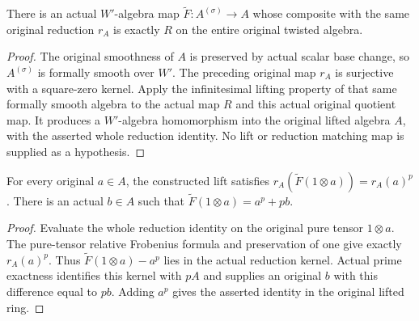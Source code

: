 \begin{theorem}
\label{thm:witt-two-actual-affine-relative-lift}
\leanok
{}
There is an actual $W'$-algebra map
$\widetilde F:A^{(\sigma)}\to A$ whose composite
with the same original reduction $r_A$ is exactly
$R$ on the entire original twisted algebra.
\end{theorem}
\begin{proof}
The original smoothness of $A$ is preserved by
actual scalar base change, so $A^{(\sigma)}$ is
formally smooth over $W'$. The preceding original
map $r_A$ is surjective with a square-zero kernel.
Apply the infinitesimal lifting property of that
same formally smooth algebra to the actual map
$R$ and this actual original quotient map.
It produces a $W'$-algebra homomorphism into the
original lifted algebra $A$, with the asserted
whole reduction identity. No lift or reduction
matching map is supplied as a hypothesis.
\end{proof}

\begin{corollary}
\label{cor:witt-two-relative-lift-coordinate-correction}
\leanok
{}
For every original $a\in A$, the constructed lift satisfies
$r_A(\widetilde F(1\otimes a))=r_A(a)^p$.
There is an actual $b\in A$ such that
$\widetilde F(1\otimes a)=a^p+pb$.
\end{corollary}
\begin{proof}
Evaluate the whole reduction identity on the original pure tensor
$1\otimes a$. The pure-tensor relative Frobenius formula and
preservation of one give exactly $r_A(a)^p$. Thus
$\widetilde F(1\otimes a)-a^p$ lies in the actual reduction
kernel. Actual prime exactness identifies this kernel with $pA$
and supplies an original $b$ with this difference equal to $pb$.
Adding $a^p$ gives the asserted identity in the original lifted ring.
\end{proof}
